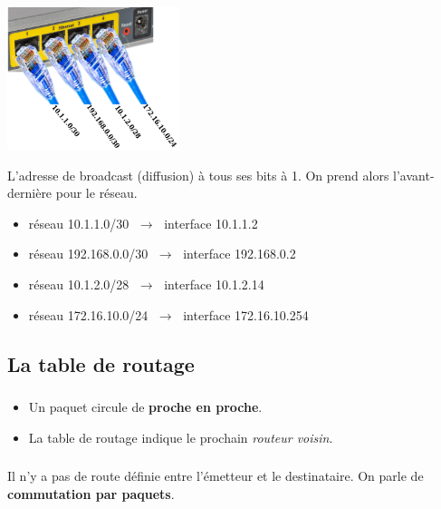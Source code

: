 \documentclass[svgnames,11pt]{beamer}
\begin{document}
\begin{frame}
    \frametitle{}

    \begin{center}
        \centering
        \includegraphics[width=5cm]{ressources/routeur-adresses.png}
        \label{routeur}
    \end{center}
    L'adresse de broadcast (diffusion) à tous ses bits à 1. On prend alors l'avant-dernière pour le réseau.
    \begin{itemize}
        \item réseau 10.1.1.0/30 $\;\rightarrow\;$ interface 10.1.1.2
        \item réseau 192.168.0.0/30 $\;\rightarrow\;$ interface 192.168.0.2
        \item réseau 10.1.2.0/28 $\;\rightarrow\;$ interface 10.1.2.14
        \item réseau 172.16.10.0/24 $\;\rightarrow\;$ interface 172.16.10.254
    \end{itemize}
\end{frame}
\subsection{La table de routage}
\begin{frame}
    \frametitle{}

    \begin{itemize}
        \item<1->Un paquet circule de \textbf{proche en proche}.
        \item <2->La table de routage indique le prochain \emph{routeur voisin}.
    \end{itemize}

\end{frame}

\begin{frame}
    \frametitle{}

    \begin{center}
        Il n'y a pas de route définie entre l'émetteur et le destinataire. On parle de \textbf{commutation par paquets}.
    \end{center}
\end{frame}
\end{document}
